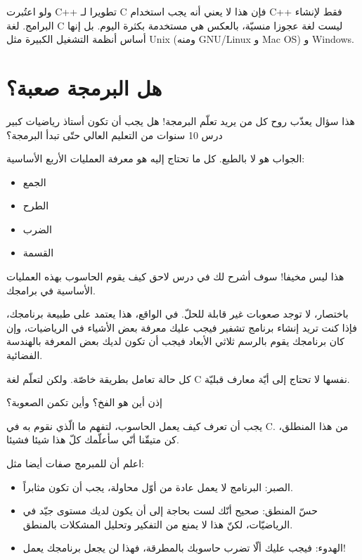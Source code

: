 ولو اعتُبرت
\textenglish{C++}
 تطويرا لـ
\textenglish{C}
 فإن هذا لا يعني أنه يجب استخدام
\textenglish{C++}
 فقط لإنشاء البرامج. لغة
\textenglish{C}
 ليست لغة عجوزا منسيّة، بالعكس هي مستخدمة بكثرة اليوم. بل إنها أساس أنظمة التشغيل الكبيرة مثل
\textenglish{Unix }
(ومنه
\textenglish{GNU/Linux}
 و
\textenglish{Mac OS}) و
\textenglish{Windows}.

\section{هل البرمجة صعبة؟}
هذا سؤال يعذّب روح كل من يريد تعلّم البرمجة! هل يجب أن تكون أستاذ رياضيات كبير درس 10 سنوات من التعليم العالي حتّى تبدأ البرمجة؟

الجواب هو لا بالطبع. كل ما تحتاج إليه هو معرفة العمليات الأربع الأساسية:
\begin{itemize}
  \item الجمع
  \item الطرح
  \item الضرب
  \item القسمة
\end{itemize}
هذا ليس مخيفا! سوف أشرح لك في درس لاحق كيف يقوم الحاسوب بهذه العمليات الأساسية في برامجك.

باختصار، لا توجد صعوبات غير قابلة للحلّ. في الواقع، هذا يعتمد على طبيعة برنامجك، فإذا كنت تريد إنشاء برنامج تشفير فيجب عليك معرفة بعض الأشياء في الرياضيات، وإن كان برنامجك يقوم بالرسم ثلاثي الأبعاد فيجب أن تكون لديك بعض المعرفة بالهندسة الفضائية.

كل حالة تعامل بطريقة خاصّة. ولكن لتعلّم لغة
\textenglish{C}
 نفسها لا تحتاج إلى أيّة معارف قبليّة.

\begin{question}
  إذن أين هو الفخ؟ وأين تكمن الصعوبة؟
\end{question}

يجب أن تعرف كيف يعمل الحاسوب، لتفهم ما الّذي نقوم به في \textenglish{C}. من هذا المنطلق، كن متيقّنا أنّي سأعلّمك كلّ هذا شيئا فشيئا.

اعلم أن للمبرمج صفات أيضا مثل:
\begin{itemize}
  \item الصبر: البرنامج لا يعمل عادة من أوّل محاولة، يجب أن تكون مثابراً.
  \item حسّ المنطق: صحيح أنّك لست بحاجة إلى أن يكون لديك مستوى جيّد في الرياضيّات، لكنّ هذا لا يمنع من التفكير وتحليل المشكلات بالمنطق.
  \item الهدوء: فيجب عليك ألّا تضرب حاسوبك بالمطرقة، فهذا لن يجعل برنامجك يعمل!
\end{itemize}
